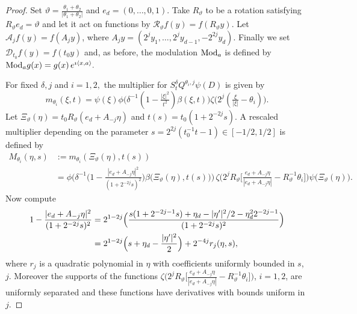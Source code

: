 \documentclass[11pt]{amsart}
\theoremstyle{definition}
\numberwithin{theorem}{section}
\numberwithin{definition}{section}
\def\Mod{\text{{\rm Mod}}}
\def\im{\imath}
\def\inn#1#2{\langle#1,#2\rangle}
\newcommand{\note}[1]{\footnote{\texttt{\Small #1}}}
\def\vth{\vartheta}
\def\inn#1#2{\langle#1,#2\rangle}
\def\cA{{\mathcal {A}}}
\def\cD{{\mathcal {D}}}
\def\cR{{\mathcal {R}}}
\begin{document}
\begin{proof}
Set $\vth=\frac{\theta_1+\theta_2}{|\theta_1+\theta_2|}$ and
$e_d=(0,\dots,0,1)$. Take $R_\vth$ to be a rotation satisfying
$R_\vth e_d=\vth$ and let it act on functions by $\cR_\vth
f(y)=f(R_\vth y)$. Let $ \cA_j f(y)= f(A_jy)$, where
$A_jy=(2^{j}y_1,\dots, 2^j y_{d-1},- 2^{2j}y_d)$. Finally we set
$\cD_{t_0} f(y)= f(t_0y)$ and, as before, the modulation $\Mod_{a}$
is defined by $\Mod_{a} g(x) = g(x)\,e^{\im \inn{x}{a}}.$

For fixed $\delta, j$ and $i=1,2,$
the multiplier for
$S_t^\delta  Q^{\theta_i,j}\psi (D)$ is given by
$$m_{\theta_i}(\xi,t) =\psi (\xi) \phi \Big(\delta^{-1}(1-\tfrac {|\xi|^2}{t^2})
\beta(\xi,t)\Big) \zeta\Big(2^j (\tfrac{\xi}{|\xi|}-\theta_i)\Big).$$
Let $\Xi_\vth(\eta)=t_0R_\vth(e_d+A_{-j}\eta)$ and $t(s)= t_0(1+2^{-2j}s)$.
A rescaled multiplier depending on the parameter
$s= 2^{2j}(t_0^{-1}t-1)\in [-1/2,1/2]$ is defined by
%
%
\begin{align*}
M_{\theta_i}(\eta, s)&:=
m_{\theta_i}(\Xi_\vth(\eta),  t(s))
\\&= \phi \Big(\delta^{-1}\big(1- \tfrac{|e_d+A_{-j}\eta|^2}{(1+2^{-2j}s)^2}\big)
 \beta\big(\Xi_\vth(\eta), t(s)\big)\Big)\,
\zeta\big( 2^jR_\vth\big[
\tfrac{e_d+A_{-j}\eta}{|e_d+A_{-j}\eta|}
- R^{-1}_\vth\theta_i\big]\big)\psi \big(\Xi_\vth(\eta)\big).
\end{align*}
Now compute
\begin{align}
1- \frac{|e_d+A_{-j}\eta|^2}{(1+2^{-2j}s)^2}
&=2^{1-2j} \Big( \frac{s(1+2^{-2j-1}s)+\eta_d-|\eta'|^2/2-\eta_d^2 2^{-2j-1}}{(1+2^{-2j}s)^2}\Big)
\notag
\\&= 2^{1-2j}
\Big(s+\eta_d-\frac{|\eta'|^2}{2}\Big)+ 2^{-4j}
r_j(\eta,s),
\label{paraboloid}
\end{align}
where  $r_{j}$ is a quadratic polynomial in $\eta$ with coefficients uniformly
bounded in $s$, $j$.
  Moreover the supports of the functions
$\zeta\big( 2^jR_\vth\big[
\tfrac{e_d+A_{-j}\eta}{|e_d+A_{-j}\eta|}- R^{-1}_\vth\theta_i\big]\big)$,
$i=1,2$, are uniformly separated  and these functions have derivatives
with bounds uniform in $j$.



\end{proof}
\end{document}
